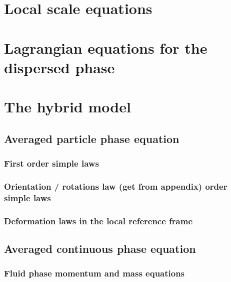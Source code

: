 \documentclass[12pt,a4paper,openany]{My_book}
\begin{document}
\section{Local scale equations}


\section{Lagrangian equations for the dispersed phase}

% 
% 

% 

\section{The hybrid model}
\subsection{Averaged particle phase equation}
\subsubsection{First order simple laws}
\subsubsection{Orientation / rotations law (get from appendix) order simple laws}
\subsubsection{Deformation laws in the local reference frame}

\subsection{Averaged continuous phase equation}

\subsubsection{Fluid phase momentum and mass equations}


\end{document}

